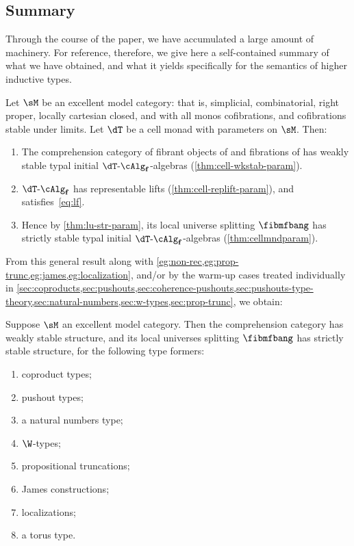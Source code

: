 \begin{enumerate}
\begin{enumerate}
\section{Summary}
\label{sec:summary}

Through the course of the paper, we have accumulated a large amount of machinery.
%
For reference, therefore, we give here a self-contained summary of what we have obtained, and what it yields specifically for the semantics of higher inductive types.

\begin{thm}
  Let $\sM$ be an excellent model category: that is, simplicial, combinatorial, right proper, locally cartesian closed, and with all monos cofibrations, and cofibrations stable under limits.
  Let $\dT$ be a cell monad with parameters on $\sM$.
  Then:
  \begin{enumerate}
  \item The comprehension category \fibmf of fibrant objects of \sM and fibrations of \sM has weakly stable typal initial $\dT\algf$-algebras (\cref{thm:cell-wkstab-param}).
  \item $\dT\algf$ has representable lifts (\cref{thm:cell-replift-param}), and \Mf satisfies~\eqref{eq:lf}.
  \item Hence by \cref{thm:lu-str-param}, its local universe splitting $\fibmfbang$ has strictly stable typal initial $\dT\algf$-algebras (\cref{thm:cellmndparam}).
  \end{enumerate}
\end{thm}

From this general result along with \cref{eg:non-rec,eg:prop-trunc,eg:james,eg:localization}, and/or by the warm-up cases treated individually in \cref{sec:coproducts,sec:pushouts,sec:coherence-pushouts,sec:pushouts-type-theory,sec:natural-numbers,sec:w-types,sec:prop-trunc}, we obtain:
% 
\begin{thm}
  Suppose $\sM$ an excellent model category.  
  Then the comprehension category \fibmf has weakly stable structure, and its local universes splitting $\fibmfbang$ has strictly stable structure, for the following type formers:
  \begin{enumerate}
  \item coproduct types;
  \item pushout types;
  \item a natural numbers type;
  \item $\W$-types;
  \item propositional truncations;
  \item James constructions;
  \item localizations;
  \item a torus type.
  \end{enumerate}
\end{thm}


\end{enumerate}
\end{enumerate}
